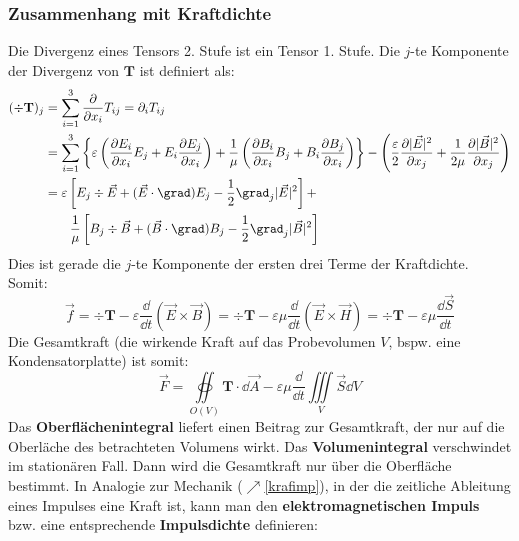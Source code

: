   \subsubsection{Zusammenhang mit Kraftdichte}
  Die Divergenz eines Tensors 2. Stufe ist ein Tensor 1. Stufe. Die \(j\)-te Komponente der Divergenz von \(\mathbf{T}\) ist definiert als:
		        \begin{equation}\begin{split}
				        (\div \mathbf{T})_j &= \sum_{i=1}^3 \frac{\partial}{\partial x_i} T_{ij} = \partial_i T_{ij} \\
				        &= \sum_{i=1}^3 \left\{ \varepsilon\left( \frac{\partial E_i}{\partial x_i} E_j + E_i\frac{\partial E_j}{\partial x_i} \right) +
				        \frac{1}{\mu}\left( \frac{\partial B_i}{\partial x_i} B_j + B_i\frac{\partial B_j}{\partial x_i} \right)
				        \right\} - \left(\frac{\varepsilon}{2}\frac{\partial |\vec{E}|^2}{\partial x_j} + \frac{1}{2\mu}\frac{\partial |\vec{B} |^2}{\partial x_j}\right)\\
				        &=\varepsilon\left[E_j \div \vec{E} + (\vec{E}\cdot\grad )E_j - \frac{1}{2}\grad _j |\vec{E}|^2 \right] +\\
				        &\qquad \frac{1}{\mu}\left[B_j \div \vec{B}  + (\vec{B} \cdot\grad )B_j - \frac{1}{2}\grad _j |\vec{B} |^2 \right]
			        \end{split}\end{equation}
		   Dies ist gerade die \(j\)-te Komponente der ersten drei Terme der Kraftdichte. Somit:
		        \begin{equation}\label{kraftdmax}
			        \boxed{\vec{f}= \div \mathbf{T} - \varepsilon\frac{\dd}{\dd t}\left( \vec{E} \times \vec{B} \right)
				        = \div \mathbf{T} - \varepsilon\mu\frac{\dd}{\dd t}\left( \vec{E} \times \vec{H} \right)
				        = \div \mathbf{T} - \varepsilon\mu\frac{\dd \vec{S}}{\dd t}}
		        \end{equation}
		   Die Gesamtkraft (die wirkende Kraft auf das Probevolumen $V$, bspw. eine Kondensatorplatte) ist somit:
		        \begin{equation}
			        \boxed{\vec{F}  = \oiint\limits_{O(V)} \mathbf{T} \cdot \dd\vec{A} - \varepsilon\mu\frac{\dd}{\dd t} \iiint\limits_V \vec{S} \dd V}
		        \end{equation}
	  Das \textbf{Oberflächenintegral} liefert einen Beitrag zur Gesamtkraft, der nur auf die Oberläche des betrachteten Volumens wirkt. Das \textbf{Volumenintegral} verschwindet im stationären Fall. Dann wird die Gesamtkraft nur über die Oberfläche bestimmt. In Analogie zur Mechanik ($\nearrow$\ref{krafimp}), in der die zeitliche Ableitung eines Impulses eine Kraft ist, kann man den \textbf{elektromagnetischen Impuls} bzw. eine entsprechende \textbf{Impulsdichte} definieren:
